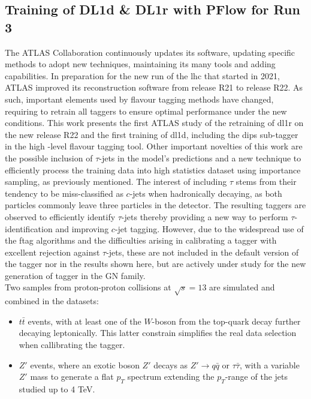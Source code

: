 \subsection{Training of DL1d \& DL1r with PFlow for Run 3}
The ATLAS Collaboration continuously updates its software, updating specific methods to adopt new techniques, maintaining its many tools and adding capabilities. In preparation for the new run of the \gls{lhc} that started in 2021, ATLAS improved its reconstruction software from release R21 to release R22. As such, important elements used by flavour tagging methods have changed, requiring to retrain all taggers to ensure optimal performance under the new conditions. This work presents the first ATLAS study of the retraining of \gls{dl1r} on the new release R22 and the first training of \gls{dl1d}, including the \gls{dips} sub-tagger in the high -level flavour tagging tool. Other important novelties of this work are the possible inclusion of $\tau$-jets in the model's predictions and a new technique to efficiently process the training data into high statistics dataset using importance sampling, as previously mentioned. The interest of including $\tau$ stems from their tendency to be miss-classified as $c$-jets when hadronically decaying, as both particles commonly leave three particles in the detector. The resulting taggers are observed to efficiently identify $\tau$-jets thereby providing a new way to perform $\tau$-identification and improving $c$-jet tagging. However, due to the widespread use of the \gls{ftag} algorithms and the difficulties arising in calibrating a tagger with excellent rejection against $\tau$-jets, these are not included in the default version of the tagger nor in the results shown here, but are actively under study for the new generation of tagger in the GN family. \\ %
Two samples from proton-proton collisions at $\sqrt{s} = 13$ are simulated and combined in the datasets:
\begin{itemize}
\item $t\bar{t}$ events, with at least one of the $W$-boson from the top-quark decay further decaying leptonically. This latter constrain simplifies the real data selection when callibrating the tagger.
\item $Z'$ events, where an exotic boson $Z'$ decays as $Z' \rightarrow q\bar{q} \textrm{ or } \tau \bar{\tau}$, with a variable $Z'$ mass to generate a flat $p_T$ spectrum extending the $p_T$-range of the jets studied up to 4 TeV.
\end{itemize}

